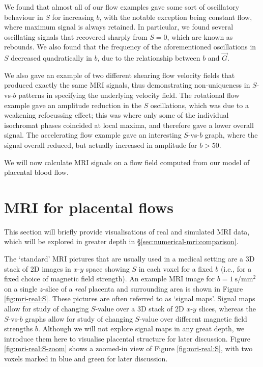             We found that almost all of our flow examples gave some sort of oscillatory behaviour in $S$ for increasing $b$, with the notable exception being constant flow, where maximum signal is always retained. In particular, we found several oscillating signals that recovered sharply from $S=0$, which are known as rebounds. We also found that the frequency of the aforementioned oscillations in $S$ decreased quadratically in $b$, due to the relationship between $b$ and $\vec{G}$.

            We also gave an example of two different shearing flow velocity fields that produced exactly the same MRI signals, thus demonstrating non-uniqueness in $S$-vs-$b$ patterns in specifying the underlying velocity field. The rotational flow example gave an amplitude reduction in the $S$ oscillations, which was due to a weakening refocussing effect; this was where only some of the individual isochromat phases coincided at local maxima, and therefore gave a lower overall signal. The accelerating flow example gave an interesting $S$-vs-$b$ graph, where the signal overall reduced, but actually increased in amplitude for $b > 50$.

            We will now calculate MRI signals on a flow field computed from our model of placental blood flow.

    \section{MRI for placental flows} \label{sec:numerical-mri:placental}
        This section will briefly provide visualisations of real and simulated MRI data, which will be explored in greater depth in \S\ref{sec:numerical-mri:comparison}.
    
        The `standard' MRI pictures that are usually used in a medical setting are a 3D stack of 2D images in $x$-$y$ space showing $S$ in each voxel for a fixed $b$ (i.e., for a fixed choice of magnetic field strength). An example MRI image for $b=\qty{1}{\second\per\milli\metre^2}$ on a single $z$-slice of a \textit{real} placenta and surrounding area is shown in Figure \ref{fig:mri-real:S}. These pictures are often referred to as `signal maps'. Signal maps allow for study of changing $S$-value over a 3D stack of 2D $x$-$y$ slices, whereas the $S$-vs-$b$ graphs allow for study of changing $S$-value over different magnetic field strengths $b$. Although we will not explore signal maps in any great depth, we introduce them here to visualise placental structure for later discussion. Figure \ref{fig:mri-real:S-zoom} shows a zoomed-in view of Figure \ref{fig:mri-real:S}, with two voxels marked in blue and green for later discussion. 

